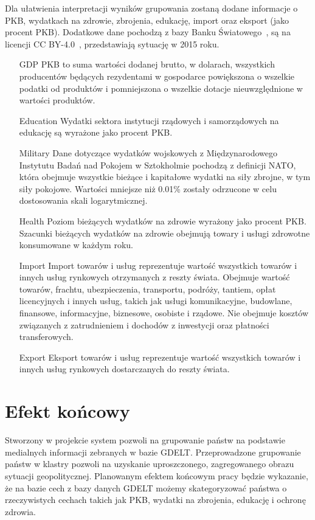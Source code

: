 \documentclass[11pt]{report}
\begin{document}
    Dla ułatwienia interpretacji wyników grupowania zostaną dodane informacje o PKB, wydatkach na zdrowie, zbrojenia, edukację, import oraz eksport (jako procent PKB).
    Dodatkowe dane pochodzą z bazy Banku Światowego~\cite{worldbank}, są na licencji CC BY-4.0~\cite{wblicense}, przedstawiają sytuację w 2015 roku.
    \begin{enumerate}
        \item[GDP] PKB to suma wartości dodanej brutto, w dolarach, wszystkich producentów będących rezydentami w gospodarce powiększona o wszelkie podatki od produktów i pomniejszona o wszelkie dotacje nieuwzględnione w wartości produktów.
        \item[Education] Wydatki sektora instytucji rządowych i samorządowych na edukację są wyrażone jako procent PKB.
        \item[Military] Dane dotyczące wydatków wojskowych z Międzynarodowego Instytutu Badań nad Pokojem w Sztokholmie pochodzą z definicji NATO, która obejmuje wszystkie bieżące i kapitałowe wydatki na siły zbrojne, w tym siły pokojowe.
        Wartości mniejsze niż 0.01\% zostały odrzucone w celu dostosowania skali logarytmicznej.
        \item[Health] Poziom bieżących wydatków na zdrowie wyrażony jako procent PKB. Szacunki bieżących wydatków na zdrowie obejmują towary i usługi zdrowotne konsumowane w każdym roku.
        \item[Import] Import towarów i usług reprezentuje wartość wszystkich towarów i innych usług rynkowych otrzymanych z reszty świata.
        Obejmuje wartość towarów, frachtu, ubezpieczenia, transportu, podróży, tantiem, opłat licencyjnych i innych usług, takich jak usługi komunikacyjne, budowlane, finansowe, informacyjne, biznesowe, osobiste i rządowe.
        Nie obejmuje kosztów związanych z zatrudnieniem i dochodów z inwestycji oraz płatności transferowych.
        \item[Export] Eksport towarów i usług reprezentuje wartość wszystkich towarów i innych usług rynkowych dostarczanych do reszty świata.
    \end{enumerate}


    \section{Efekt końcowy}\label{sec:efekt-końcowy}
    Stworzony w projekcie system pozwoli na grupowanie państw na podstawie medialnych informacji zebranych w bazie GDELT.
    Przeprowadzone grupowanie państw w klastry pozwoli na uzyskanie uproszczonego, zagregowanego obrazu sytuacji geopolitycznej.
    Planowanym efektem końcowym pracy będzie wykazanie, że na bazie cech z bazy danych GDELT możemy skategoryzować państwa o rzeczywistych cechach takich jak PKB, wydatki na zbrojenia, edukację i ochronę zdrowia.
\end{document}
